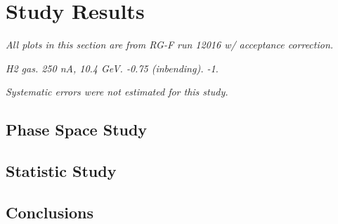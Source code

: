 \section{Study Results}
\begin{frame}{}
    \label{12.00::study_results}
    \centering \Huge{}

    \vspace{9pt}

    \small{\textit{
        All plots in this section are from RG-F run 12016 w/ acceptance correction.
    }}

    \small{\textit{
         H2 gas.
         250 nA, 10.4 GeV.
         -0.75 (inbending).
         -1.
    }}

    \small{\textit{
        Systematic errors were not estimated for this study.
    }}
\end{frame}

\subsection{Phase Space Study}


\subsection{Statistic Study}


\subsection{Conclusions}

